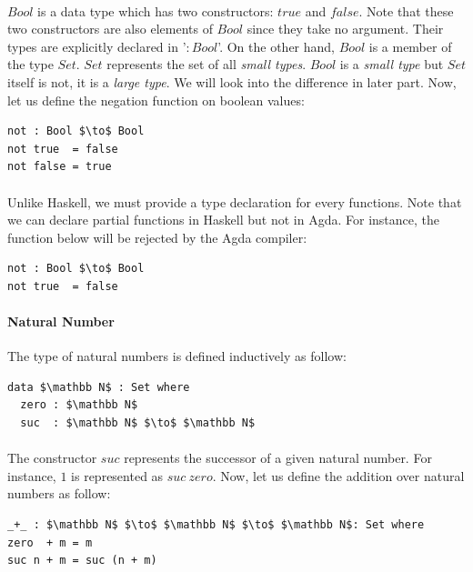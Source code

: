 \documentclass[twoside,openright,final]{bhamthesis}
\begin{document}
\paragraph{} \(Bool\) is a data type which has two
constructors: \(true\) and \(false\). Note that these two constructors
are also elements of \(Bool\) since they take no argument. Their types are explicitly declared in '\(:
Bool\)'. On the other hand, \(Bool\) is a member of the type \(Set\). \(Set\)
represents the set of all \textit{small types}. \(Bool\) is a
\textit{small type} but \(Set\) itself is not, it is a \textit{large
  type}. We will look into the difference in later
part. Now, let us define the negation function on boolean values:
\begin{lstlisting}[mathescape=true,xleftmargin=.3\textwidth]
not : Bool $\to$ Bool
not true  = false
not false = true
\end{lstlisting}

\paragraph{} Unlike Haskell, we must provide a type declaration for every
functions. Note that we can declare partial
functions in Haskell but not in Agda. For instance, the function below
will be rejected by the Agda compiler:
\begin{lstlisting}[mathescape=true,xleftmargin=.3\textwidth]
not : Bool $\to$ Bool
not true  = false
\end{lstlisting}

\paragraph{Natural Number} The type of natural numbers is defined
inductively as follow: 
\begin{lstlisting}[mathescape=true,xleftmargin=.3\textwidth]
data $\mathbb N$ : Set where
  zero : $\mathbb N$
  suc  : $\mathbb N$ $\to$ $\mathbb N$
\end{lstlisting} 

\paragraph{} The constructor \(suc\) represents the successor of a given
natural number. For instance, \(1\) is represented as \(suc\
zero\). Now, let us define the addition over natural numbers as follow:
\begin{lstlisting}[mathescape=true,xleftmargin=.3\textwidth]
_+_ : $\mathbb N$ $\to$ $\mathbb N$ $\to$ $\mathbb N$: Set where
zero  + m = m
suc n + m = suc (n + m)
\end{lstlisting} 
\end{document}
